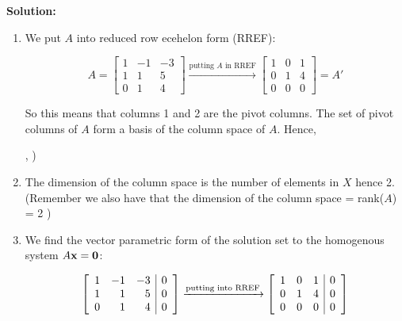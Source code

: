 \documentclass[12pt]{article}
\newcommand*\mybluebox[1]{%
\colorbox{myblue}{\hspace{1em}#1\hspace{1em}}}
\begin{document}
{\bf Solution:} 

\begin{enumerate}
\item We put $A$ into reduced row ecehelon form (RREF):

\[ A=\left[ \begin{array}{rrr} 1 & -1 & -3  \\ 1 & 1 & 5 \\ 0&1&4  \end{array} \right] \xrightarrow[]{\text{putting } A \text{ in RREF}}  \left[ \begin{array}{rrr} 1 & 0 & 1  \\ 0 & 1 & 4 \\ 0&0&0  \end{array} \right]=A'
\]

So this means that columns 1 and 2 are the pivot columns.  The set of pivot columns of $A$ form a basis of the column space of $A$.  Hence,

\begin{empheq}[box=\mybluebox]{align*}
X =  \left( \left[ \begin{array}{r} 1 \\ 1  \\ 0  \end{array} \right], \left[ \begin{array}{r} -1 \\  1 \\ 1  \end{array} \right] \right)
\end{empheq}

\item The dimension of the column space is the number of elements in $X$ hence \colorbox{myblue}{2}.  (Remember we also have that the dimension of the column space = rank($A$) = 2  )
 
\item We find the vector parametric form of the solution set to the homogenous system $A{\bf x}={\bf 0}$:

\[ \left[ \begin{array}{rrr| r} 1 & -1 & -3 & 0 \\ 1 & 1 & 5 & 0 \\ 0&1&4 &0 \end{array} \right] \xrightarrow[]{\text{putting into RREF}}  \left[ \begin{array}{rrr| r} 1 & 0 & 1 &0 \\ 0 & 1 & 4& 0 \\ 0&0&0& 0  \end{array} \right]
\]


\end{enumerate}
\end{document}
